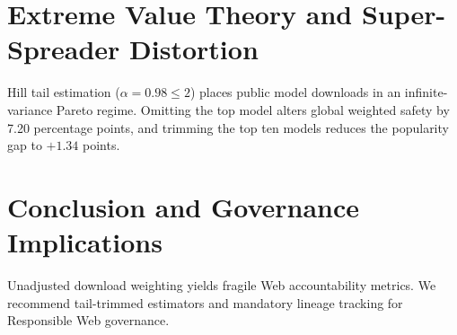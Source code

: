 \documentclass[sigconf,anonymous,review]{acmart}
\begin{document}
\section{Extreme Value Theory and Super-Spreader Distortion}
Hill tail estimation ($\alpha = 0.98 \le 2$) places public model downloads in an infinite-variance Pareto regime. Omitting the top model alters global weighted safety by 7.20 percentage points, and trimming the top ten models reduces the popularity gap to $+1.34$ points.

\section{Conclusion and Governance Implications}
Unadjusted download weighting yields fragile Web accountability metrics. We recommend tail-trimmed estimators and mandatory lineage tracking for Responsible Web governance.



\end{document}
